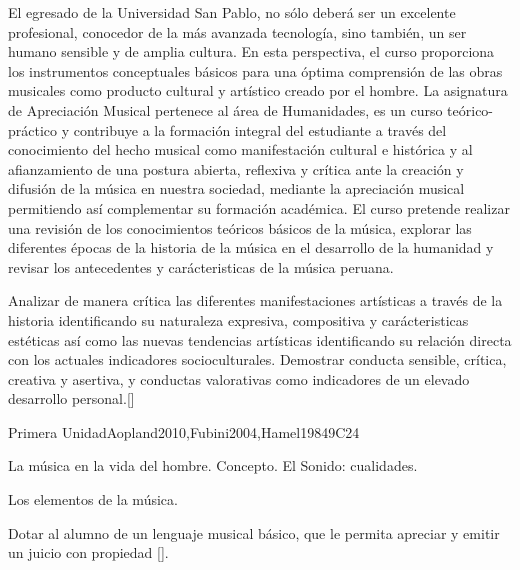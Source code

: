\begin{syllabus}


\begin{justification}
El egresado de la Universidad San Pablo, no sólo deberá ser un excelente profesional, conocedor de la más avanzada tecnología, sino también, un ser humano sensible y de amplia cultura. En esta perspectiva, el curso proporciona los instrumentos conceptuales básicos para una óptima comprensión de las obras musicales como producto cultural y artístico creado por el hombre.
La asignatura de Apreciación Musical pertenece al área de Humanidades, es  un curso teórico-práctico y contribuye a la formación integral del estudiante a través del  conocimiento del hecho musical como manifestación cultural e histórica y al afianzamiento de una postura abierta, reflexiva y crítica ante la creación y difusión de la música en nuestra sociedad, mediante la apreciación musical permitiendo así  complementar  su formación académica. El curso pretende realizar una revisión de los conocimientos teóricos básicos de la música, explorar las diferentes épocas de la historia de la música en el desarrollo de la humanidad y revisar los antecedentes y carácteristicas de la música peruana.
\end{justification}

\begin{goals}
\item Analizar de manera crítica las diferentes manifestaciones artísticas a través de la historia identificando su naturaleza expresiva, compositiva y carácteristicas estéticas así como las nuevas tendencias artísticas identificando su relación directa con los actuales indicadores socioculturales. Demostrar conducta sensible, crítica, creativa y asertiva, y conductas valorativas como indicadores de un elevado desarrollo personal.[\Familiarity]
\end{goals}

\begin{outcomes}
    \item {}
\end{outcomes}
\begin{competences}
    \item {}
\end{competences}

\begin{unit}{}{Primera Unidad}{Aopland2010,Fubini2004,Hamel1984}{9}{C24}
\begin{topics}
	\item La música en la vida del hombre. 
		\subitem Concepto. 
		\subitem El Sonido: cualidades.
	\item Los elementos de la música. 
\end{topics}
\begin{learningoutcomes}
	\item Dotar al alumno de un lenguaje musical básico, que le permita apreciar y emitir un juicio con propiedad [\Usage].
\end{learningoutcomes}
\end{unit}


\end{syllabus}
